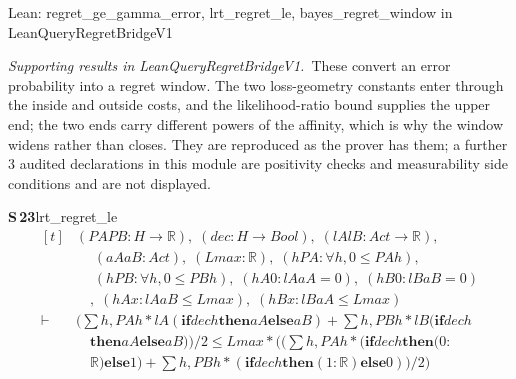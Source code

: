 \documentclass[conference]{IEEEtran}
\theoremstyle{definition}
\newcommand{\lean}[1]{\textsf{\footnotesize #1}}
\newcommand{\leanbox}[1]{%
  \par\vspace{2pt}\noindent
  {\footnotesize\textsf{Lean: #1}}\par\vspace{2pt}}
\begin{document}
\leanbox{\lean{regret\_ge\_gamma\_error}, \lean{lrt\_regret\_le},
\lean{bayes\_regret\_window} in \lean{LeanQueryRegretBridgeV1}}

\noindent\emph{Supporting results in \lean{LeanQueryRegretBridgeV1}.}~These convert an error probability into a regret window. The two loss-geometry constants enter through the inside and outside costs, and the likelihood-ratio bound supplies the upper end; the two ends carry different powers of the affinity, which is why the window widens rather than closes. They are reproduced as the prover has them; a further $3$ audited declarations in this module are positivity checks and measurability side conditions and are not displayed.

\noindent\textbf{S\,23}\quad\lean{lrt\_regret\_le}
{\footnotesize\[ \begin{aligned}[t]
&(\mathit{PA} \mathit{PB} : \mathit{H} \to \mathbb{R} ),\; (\mathit{dec} : \mathit{H} \to \mathit{Bool}),\; (\mathit{lA} \mathit{lB} : \mathit{Act} \to \mathbb{R} ),\\
&\quad \; (\mathit{aA} \mathit{aB} : \mathit{Act}),\; (\mathit{Lmax} : \mathbb{R} ),\; (\mathit{hPA} : \forall \mathit{h}, 0 \leq \mathit{PA} \mathit{h}),\\
&\quad \; (\mathit{hPB} : \forall \mathit{h}, 0 \leq \mathit{PB} \mathit{h}),\; (\mathit{hA0} : \mathit{lA} \mathit{aA} = 0),\; (\mathit{hB0} : \mathit{lB} \mathit{aB} = 0)\\
&\quad ,\; (\mathit{hAx} : \mathit{lA} \mathit{aB} \leq \mathit{Lmax}),\; (\mathit{hBx} : \mathit{lB} \mathit{aA} \leq \mathit{Lmax})\\
\vdash\;&(\textstyle\sum \mathit{h}, \mathit{PA} \mathit{h} * \mathit{lA} (\mathbf{if} \mathit{dec} \mathit{h} \mathbf{then} \mathit{aA} \mathbf{else} \mathit{aB}) + \textstyle\sum \mathit{h}, \mathit{PB} \mathit{h} * \mathit{lB} (\mathbf{if} \mathit{dec} \mathit{h}\\
&\quad \mathbf{then} \mathit{aA} \mathbf{else} \mathit{aB})) / 2 \leq \mathit{Lmax} * ((\textstyle\sum \mathit{h}, \mathit{PA} \mathit{h} * (\mathbf{if} \mathit{dec} \mathit{h} \mathbf{then} (0:\\
&\quad \mathbb{R} ) \mathbf{else} 1) + \textstyle\sum \mathit{h}, \mathit{PB} \mathit{h} * (\mathbf{if} \mathit{dec} \mathit{h} \mathbf{then} (1:\mathbb{R} ) \mathbf{else} 0)) / 2)
\end{aligned} \]}
\end{document}
